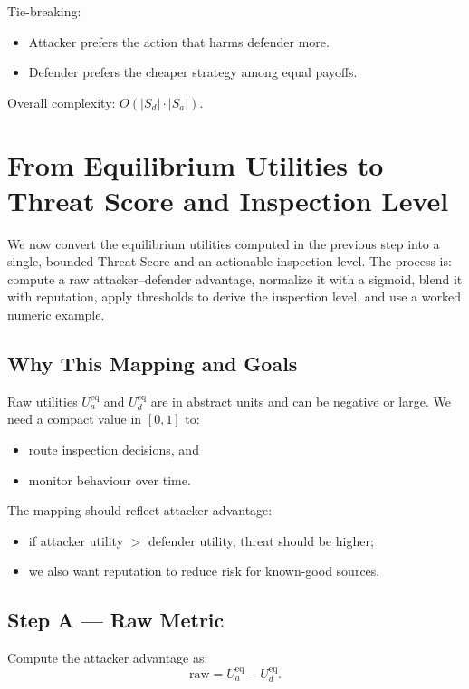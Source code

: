 \documentclass[12pt, a4paper]{report}
\begin{document}
Tie-breaking:
\begin{itemize}
    \item Attacker prefers the action that harms defender more.
    \item Defender prefers the cheaper strategy among equal payoffs.
\end{itemize}

Overall complexity: $O(|S_d|\cdot|S_a|)$.

\section{From Equilibrium Utilities to Threat Score and Inspection Level}

We now convert the equilibrium utilities computed in the previous step into a
single, bounded Threat Score and an actionable inspection level. The process is:
compute a raw attacker–defender advantage, normalize it with a sigmoid,
blend it with reputation, apply thresholds to derive the inspection level, and
use a worked numeric example.

\subsection*{Why This Mapping and Goals}

Raw utilities $U_a^{\text{eq}}$ and $U_d^{\text{eq}}$ are in abstract units and can be
negative or large. We need a compact value in $[0,1]$ to:

\begin{itemize}
    \item route inspection decisions, and
    \item monitor behaviour over time.
\end{itemize}

The mapping should reflect attacker advantage:

\begin{itemize}
    \item if attacker utility $>$ defender utility, threat should be higher;
    \item we also want reputation to reduce risk for known-good sources.
\end{itemize}

\subsection*{Step A — Raw Metric}

Compute the attacker advantage as:
\[
\text{raw} = U_a^{\text{eq}} - U_d^{\text{eq}}.
\]
\end{document}
